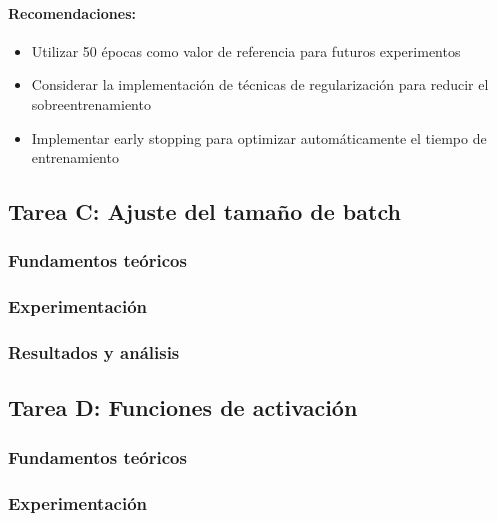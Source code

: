 \documentclass[11pt,a4paper]{article}
\begin{document}
\paragraph{Recomendaciones:}
\begin{itemize}
	\item Utilizar 50 épocas como valor de referencia para futuros experimentos
	\item Considerar la implementación de técnicas de regularización para reducir el sobreentrenamiento
	\item Implementar early stopping para optimizar automáticamente el tiempo de entrenamiento
\end{itemize}

\subsection{Tarea C: Ajuste del tamaño de batch}
\subsubsection{Fundamentos teóricos}

\subsubsection{Experimentación}

\subsubsection{Resultados y análisis}

\subsection{Tarea D: Funciones de activación}
\subsubsection{Fundamentos teóricos}

\subsubsection{Experimentación}
\end{document}
